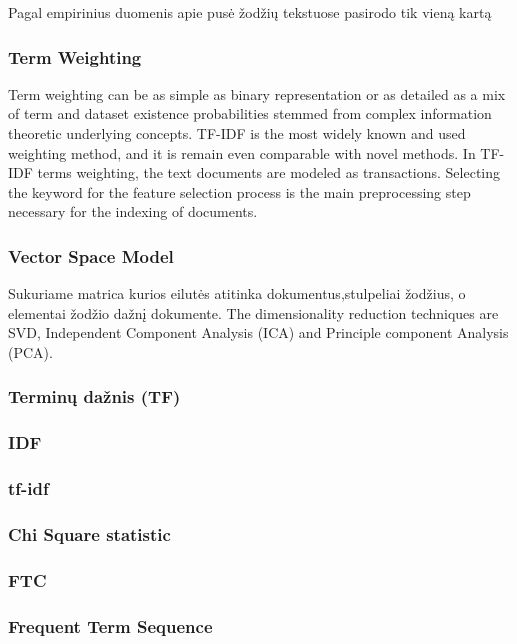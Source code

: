 \documentclass{VUMIFInfKursinis}
\begin{document}
		Pagal empirinius duomenis apie pusė žodžių tekstuose pasirodo tik vieną kartą \cite{piaseckiene2014statistiniai} 
		\subsubsection{Term Weighting}
			Term weighting can be as simple as binary representation or as detailed as a mix of term and dataset existence probabilities stemmed from complex information theoretic underlying concepts. TF-IDF is the most widely known and used weighting method, and it is remain even comparable with novel methods. In TF-IDF terms weighting, the text documents are modeled as transactions.  Selecting the keyword for the feature selection process is the main preprocessing step necessary for the indexing of documents.
		\subsubsection{Vector Space Model}
			Sukuriame matrica kurios eilutės atitinka dokumentus,stulpeliai žodžius, o elementai žodžio dažnį dokumente.
			The dimensionality reduction techniques are SVD, Independent Component Analysis (ICA) and Principle component Analysis (PCA). 

		\subsubsection{Terminų dažnis (TF)}


		\subsubsection{IDF}

		\subsubsection{tf-idf}


		\subsubsection{Chi Square statistic}

		\subsubsection{FTC}

		\subsubsection{Frequent Term Sequence}
\end{document}
